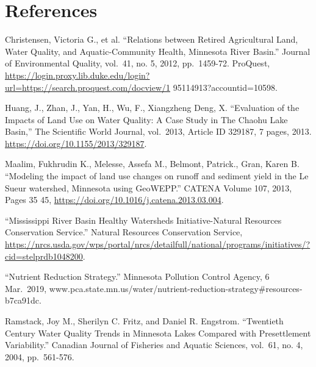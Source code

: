 \documentclass[12pt,]{article}
\begin{document}
\newpage

\hypertarget{references}{%
\section{References}\label{references}}

 Christensen, Victoria G., et al. ``Relations between Retired
Agricultural Land, Water Quality, and Aquatic-Community Health,
Minnesota River Basin.'' Journal of Environmental Quality, vol.~41, no.
5, 2012, pp.~1459-72. ProQuest,
\url{https://login.proxy.lib.duke.edu/login?url=https://search.proquest.com/docview/1}
95114913?accountid=10598.

Huang, J., Zhan, J., Yan, H., Wu, F., Xiangzheng Deng, X. ``Evaluation
of the Impacts of Land Use on Water Quality: A Case Study in The Chaohu
Lake Basin,'' The Scientific World Journal, vol.~2013, Article ID
329187, 7 pages, 2013. \url{https://doi.org/10.1155/2013/329187}.

Maalim, Fukhrudin K., Melesse, Assefa M., Belmont, Patrick., Gran, Karen
B. ``Modeling the impact of land use changes on runoff and sediment
yield in the Le Sueur watershed, Minnesota using GeoWEPP.'' CATENA
Volume 107, 2013, Pages 35 45,
\url{https://doi.org/10.1016/j.catena.2013.03.004}.

``Mississippi River Basin Healthy Watersheds Initiative-Natural
Resources Conservation Service.'' Natural Resources Conservation
Service,
\url{https://nrcs.usda.gov/wps/portal/nrcs/detailfull/national/programs/initiatives/?cid=stelprdb1048200}.

``Nutrient Reduction Strategy.'' Minnesota Pollution Control Agency, 6
Mar.~2019,
www.pca.state.mn.us/water/nutrient-reduction-strategy\#resources-b7ca91dc.

Ramstack, Joy M., Sherilyn C. Fritz, and Daniel R. Engstrom. ``Twentieth
Century Water Quality Trends in Minnesota Lakes Compared with
Presettlement Variability.'' Canadian Journal of Fisheries and Aquatic
Sciences, vol.~61, no. 4, 2004, pp.~561-576.
\end{document}

